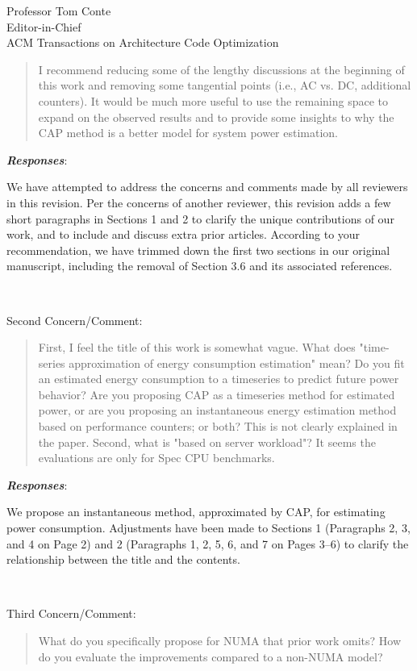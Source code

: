 \documentclass[10pt]{letter} %
\newenvironment{rviewcomment}
{~\\%
\begin{bfseries}}
{\end{bfseries}}
\newcommand{\rviewresponses}{\textbf{\textit{Responses}}:}
\begin{document}
\begin{letter}{Professor Tom Conte \\
Editor-in-Chief \\
ACM Transactions on Architecture Code Optimization }
\begin{quote}
\begin{itshape}
    I recommend reducing some of the lengthy discussions at the
    beginning of this work and removing some tangential points (i.e., AC
    vs. DC, additional counters). It would be much more useful to use
    the remaining space to expand on the observed results and to provide
    some insights to why the CAP method is a better model for system
    power estimation.
  \end{itshape}
\end{quote}

\rviewresponses 

We have attempted to address the concerns and comments made by all
reviewers in this revision. Per the concerns of another reviewer, this
revision adds a few short paragraphs in Sections 1 and 2 to clarify the
unique contributions of our work, and to include and discuss extra prior
articles.  According to your recommendation, we have trimmed down the
first two sections in our original manuscript, including the removal of
Section 3.6 and its associated references.

\begin{rviewcomment}
  Second Concern/Comment:
\end{rviewcomment}
\begin{quote}
\begin{itshape}
  First, I feel the title of this work is somewhat vague. What does
  "time-series approximation of energy consumption estimation" mean? Do
  you fit an estimated energy consumption to a timeseries to predict
  future power behavior? Are you proposing CAP as a timeseries method
  for estimated power, or are you proposing an instantaneous energy
  estimation method based on performance counters; or both? This is not
  clearly explained in the paper. Second, what is "based on server
  workload"? It seems the evaluations are only for Spec CPU benchmarks.
\end{itshape}
\end{quote}

\rviewresponses

We propose an instantaneous method, approximated by CAP, for estimating
power consumption.  Adjustments have been made to Sections 1 (Paragraphs
2, 3, and 4 on Page 2) and 2 (Paragraphs 1, 2, 5, 6, and 7 on Pages
3--6) to clarify the relationship between the title and the contents.

\begin{rviewcomment}
  Third Concern/Comment:
\end{rviewcomment}
\begin{quote}
  \begin{itshape}
    What do you specifically propose for NUMA that prior work omits? How
    do you evaluate the improvements compared to a non-NUMA model?
  \end{itshape}
\end{quote}


\end{letter}
\end{document}
